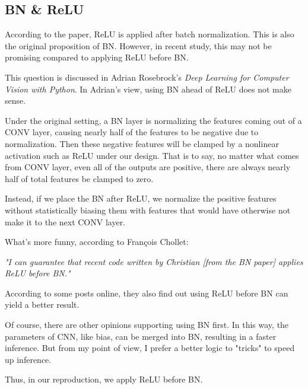 \subsection{BN \& ReLU}

According to the paper, ReLU is applied after batch normalization. This is also the original proposition of BN\cite{ioffeBatchNormalizationAccelerating2015}. However, in recent study, this may not be promising compared to applying ReLU before BN.

This question is discussed in Adrian Rosebrock's \textit{Deep Learning for Computer Vision with Python}\cite{DeepLearningForCV}. In Adrian's view, using BN ahead of ReLU does not make sense.

Under the original setting, a BN layer is normalizing the features coming out of a CONV layer, causing nearly half of the features to be negative due to normalization. Then these negative features will be clamped by a nonlinear activation such as ReLU under our design. That is to say, no matter what comes from CONV layer, even all of the outputs are positive, there are always nearly half of total features be clamped to zero.

Instead, if we place the BN after ReLU, we normalize the positive features without statistically biasing them with features that would have otherwise not make it to the next CONV layer.

What's more funny, according to François Chollet:

\textit{"I can guarantee that recent code written by Christian [from the BN paper] applies ReLU before BN."}

According to some posts online, they also find out using ReLU before BN can yield a better result.

Of course, there are other opinions supporting using BN first. In this way, the parameters of CNN, like bias, can be merged into BN, resulting in a faster inference. But from my point of view, I prefer a better logic to "tricks" to speed up inference.

Thus, in our reproduction, we apply ReLU before BN.

